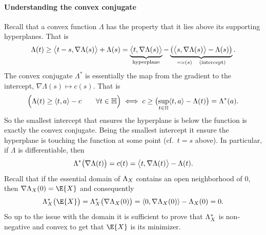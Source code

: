 \paragraph*{Understanding the convex conjugate} Recall that a convex function
\(\Lambda\) has the property that it lies above its supporting hyperplanes. That is 
\[
    \Lambda(t) \ge \scp[\big]{t-s, \nabla \Lambda(s)} + \Lambda(s)
    = \underbrace{\scp[\big]{t, \nabla \Lambda(s)}}_{\text{hyperplane}}
    - \underbrace{\bigl(\scp[\big]{s, \nabla \Lambda(s)} - \Lambda(s)\bigr)}_{\eqcolon c(s) \quad\text{(intercept)}}.
\]
The convex conjugate \(\Lambda^*\) is essentially the map from the gradient to
the intercept, \(\nabla \Lambda(s) \mapsto c(s)\). That is
\[
    \Bigl(\Lambda(t) \ge \scp{t, a} - c\qquad \forall t \in \hilbert\Bigr)
    \iff c \ge \bigl(\sup_{t \in \hilbert} \scp{t, a} - \Lambda(t)\bigr) = \Lambda^*(a).
\]
So the smallest intercept that ensures the hyperplane is below the function is
exactly the convex conjugate. Being the smallest intercept it ensure the hyperplane
is touching the function at some point (cf.~\(t=s\) above). In particular,
if \(\Lambda\) is differentiable, then
\begin{equation}
    \label{eq: gradient of cgf star}    
    \Lambda^*\bigl(\nabla\Lambda(t)\bigr)
    = c(t)
    = \scp[\big]{t, \nabla \Lambda(t)} - \Lambda(t).
\end{equation}
Recall that if the essential domain of \(\CGF_X\) contains an open
neighborhood of \(0\), then \(\nabla \CGF_X(0) = \E{X}\) and consequently
\begin{equation}
    \label{eq: cgf star at expected value}    
    \CGF_X^*\bigl(\E{X}\bigr) = \CGF_X^*\bigl(\nabla \CGF_X(0)\bigr) = \scp{0, \nabla \CGF_X(0)} - \CGF_X(0) = 0.
\end{equation}
So up to the issue with the domain it is sufficient to prove that \(\CGF_X^*\)
is non-negative and convex to get that \(\E{X}\) is its minimizer.


